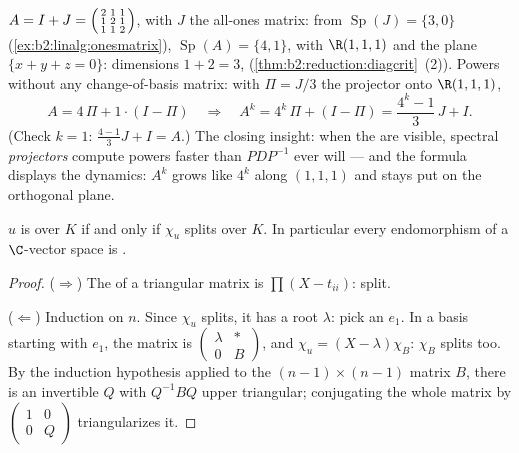 \begin{example}\label{ex:b2:reduction:diagwork}
$A = I + J = \begin{psmallmatrix}2 & 1 & 1\\ 1 & 2 & 1\\ 1 & 1 &
2\end{psmallmatrix}$, with $J$ the all-ones matrix: from
$\operatorname{Sp}(J) = \{3, 0\}$
(\cref{ex:b2:linalg:onesmatrix}), $\operatorname{Sp}(A) = \{4,
1\}$, with  $\R(1,1,1)$ and the plane $\{x + y + z =
0\}$: dimensions $1 + 2 = 3$, 
(\cref{thm:b2:reduction:diagcrit}~(2)). Powers without any
change-of-basis matrix: with $\Pi = J/3$ the projector onto
$\R(1,1,1)$,
\[
A = 4\,\Pi + 1\cdot(I - \Pi)
\quad\Longrightarrow\quad
A^k = 4^k\,\Pi + (I - \Pi)
= \frac{4^k - 1}{3}\,J + I .
\]
(Check $k = 1$: $\frac{4-1}3 J + I = A$.) The closing insight:
when the  are visible, spectral \emph{projectors}
compute powers faster than $PDP^{-1}$ ever will --- and the
formula displays the dynamics: $A^k$ grows like $4^k$ along
$(1,1,1)$ and stays put on the orthogonal plane.
\end{example}

\begin{theorem}[Trigonalization]\label{thm:b2:reduction:trigonalization}
$u$ is  over $K$ if and only if $\chi_u$ splits over
$K$. In particular every endomorphism of a $\C$-vector space is
.
\end{theorem}

\begin{proof}
($\Rightarrow$) The  of a triangular matrix
is $\prod(X - t_{ii})$: split.

($\Leftarrow$) Induction on $n$. Since $\chi_u$ splits, it has a
root $\lambda$: pick an  $e_1$. In a basis starting with
$e_1$, the matrix is $\begin{pmatrix} \lambda & \ast\\ 0 &
B\end{pmatrix}$, and $\chi_u = (X - \lambda)\chi_B$: $\chi_B$ splits
too. By the induction hypothesis applied to the $(n-1) \times
(n-1)$ matrix $B$, there is an invertible $Q$ with $Q^{-1}BQ$ upper
triangular; conjugating the whole matrix by $\begin{pmatrix}1 & 0\\
0 & Q\end{pmatrix}$ triangularizes it.
\end{proof}

